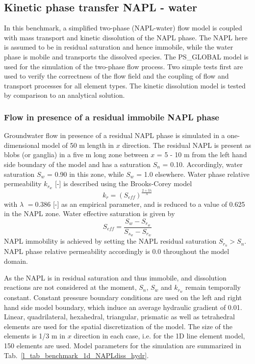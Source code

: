 

\subsection{Kinetic phase transfer NAPL - water}

In this benchmark, a simplified two-phase (NAPL-water) flow model is coupled with mass transport and kinetic dissolution of the NAPL phase. The NAPL here is assumed to be in residual saturation and hence immobile, while the water phase is mobile and transports the dissolved species. The PS\_GLOBAL model is used for the simulation of the two-phase flow process. Two simple tests first are used to verify the correctness of the flow field and the coupling of flow and transport processes for all element types. The kinetic dissolution model is tested by comparison to an analytical solution.

\subsubsection{Flow in presence of a residual immobile NAPL phase}
\label{NAPL_diss_BM_flow}

Groundwater flow in presence of a residual NAPL phase is simulated in a one-dimensional model of 50 m length in $x$ direction. The residual NAPL is present as blobs (or ganglia) in a five m long zone between $x$ = 5 - 10 m from the left hand side boundary of the model and has a saturation $S_n$ = 0.10. Accordingly, water saturation $S_w$ = 0.90 in this zone, while $S_w$ = 1.0 elsewhere. Water phase relative permeability $k_{r_w}$ [-] is described using the Brooks-Corey model
\begin{equation}
k_r = \left(S_{eff}\right)^{\frac{2+3\lambda}{\lambda}}
\label{eq_brooks-corey_krel}
\end{equation}
with $\lambda$ $= 0.386$ [-] as an empirical parameter, and is reduced to a value of 0.625 in the NAPL zone. Water effective saturation is given by
\begin{equation}
S_{eff} = \frac{S_w-S_{r_w}}{S_{s_w}-S_{r_w}}
\label{eq_Seff_brooks-corey}
\end{equation}
NAPL immobility is achieved by setting the NAPL residual saturation $S_{r_n} > S_n$. NAPL phase relative permeability accordingly is 0.0 throughout the model domain.

As the NAPL is in residual saturation and thus immobile, and dissolution reactions are not considered at the moment, $S_n$, $S_w$ and $k_{r_w}$ remain temporally constant. Constant pressure boundary conditions are used on the left and right hand side model boundary, which induce an average hydraulic gradient of 0.01. Linear, quadrilateral, hexahedral, triangular, prismatic as well as tetrahedral elements are used for the spatial discretization of the model. The size of the elements is 1/3 m in $x$ direction in each case, i.e. for the 1D line element model, 150 elements are used. Model parameters for the simulation are summarized in Tab.~\ref{l_tab_benchmark_1d_NAPLdiss_hydr}.

